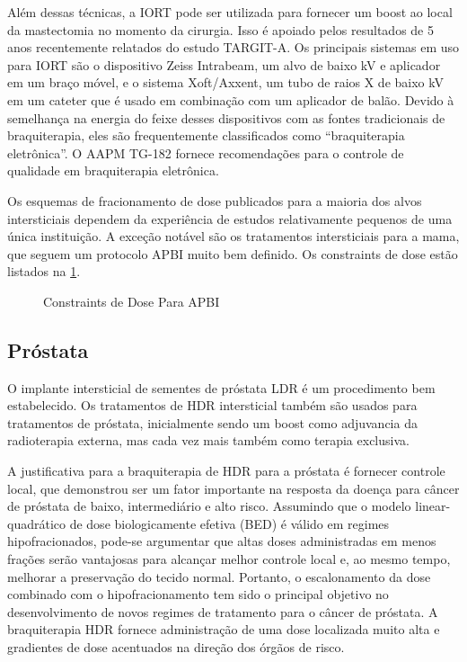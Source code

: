 \documentclass[11pt,a4paper]{article}
\begin{document}
	Além dessas técnicas, a IORT pode ser utilizada para fornecer um boost ao local da mastectomia no momento da cirurgia. Isso é apoiado pelos resultados de 5 anos recentemente relatados do estudo TARGIT-A. Os principais sistemas em uso para IORT são o dispositivo Zeiss Intrabeam, um alvo de baixo kV e aplicador em um braço móvel, e o sistema Xoft/Axxent, um tubo de raios X de baixo kV em um cateter que é usado em combinação com um aplicador de balão. Devido à semelhança na energia do feixe desses dispositivos com as fontes tradicionais de braquiterapia, eles são frequentemente classificados como “braquiterapia eletrônica”. O AAPM TG-182 fornece recomendações para o controle de qualidade em braquiterapia eletrônica.

	Os esquemas de fracionamento de dose publicados para a maioria dos alvos intersticiais dependem da experiência de estudos relativamente pequenos de uma única instituição. A exceção notável são os tratamentos intersticiais para a mama, que seguem um protocolo APBI muito bem definido. Os constraints de dose estão listados na \ref{fig:constraintsApbi}.

	\begin{figure}[h]
		\centering
		\caption{Constraints de Dose Para APBI}
		\label{fig:constraintsApbi}
	\end{figure}

\subsection*{Próstata}

	O implante intersticial de sementes de próstata LDR é um procedimento bem estabelecido. Os tratamentos de HDR intersticial também são usados para tratamentos de próstata, inicialmente sendo um boost como adjuvancia da radioterapia externa, mas cada vez mais também como terapia exclusiva.

	A justificativa para a braquiterapia de HDR para a próstata é fornecer controle local, que demonstrou ser um fator importante na resposta da doença para câncer de próstata de baixo, intermediário e alto risco. Assumindo que o modelo linear-quadrático de dose biologicamente efetiva (BED) é válido em regimes hipofracionados, pode-se argumentar que altas doses administradas em menos frações serão vantajosas para alcançar melhor controle local e, ao mesmo tempo, melhorar a preservação do tecido normal. Portanto, o escalonamento da dose combinado com o hipofracionamento tem sido o principal objetivo no desenvolvimento de novos regimes de tratamento para o câncer de próstata. A braquiterapia HDR fornece administração de uma dose localizada muito alta e gradientes de dose acentuados na direção dos órgãos de risco.
\end{document}
